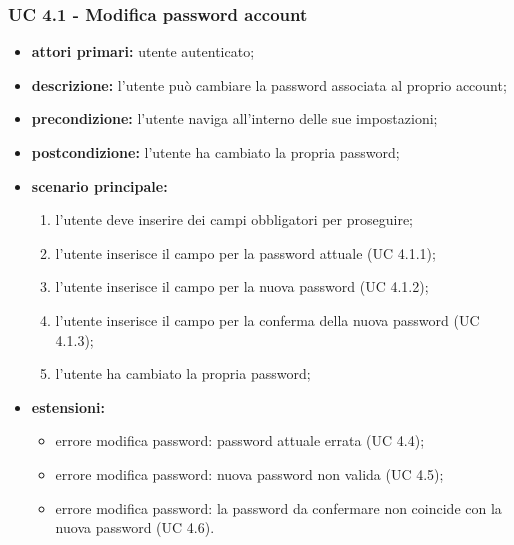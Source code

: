 			\subsubsection{UC 4.1 - Modifica password account}
			\begin{itemize}
				\item \textbf{attori primari:} utente autenticato;
				\item \textbf{descrizione:} l'utente può cambiare la password associata al proprio account;
				\item \textbf{precondizione:} l'utente naviga all'interno delle sue impostazioni;
				\item \textbf{postcondizione:} l'utente ha cambiato la propria password;
				\item \textbf{scenario principale:}
				\begin{enumerate}
					\item l'utente deve inserire dei campi obbligatori per proseguire;
					\item l'utente inserisce il campo per la password attuale (UC 4.1.1);
					\item l'utente inserisce il campo per la nuova password (UC 4.1.2);
					\item l'utente inserisce il campo per la conferma della nuova password (UC 4.1.3);
					\item l'utente ha cambiato la propria password;
				\end{enumerate}
				\item \textbf{estensioni:}
					\begin{itemize}
						\item errore modifica password: password attuale errata (UC 4.4);
						\item errore modifica password: nuova password non valida (UC 4.5);
						\item errore modifica password: la password da confermare non coincide con la nuova password (UC 4.6).
					\end{itemize}
			\end{itemize}

